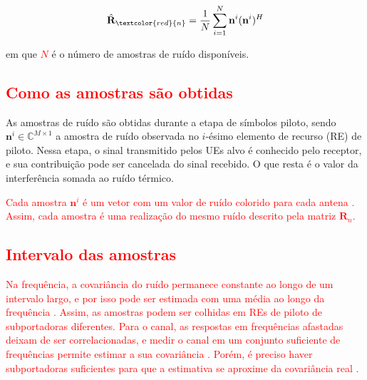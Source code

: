 $$\hat{\mathbf{R}}_{\textcolor{red}{n}}=\frac{1}{N}\sum_{i=1}^{N}\mathbf{n}^i(\mathbf{n}^i)^H$$

em que \textcolor{red}{$N$} é o número de amostras de ruído disponíveis.

\subsection{\texorpdfstring{\textcolor{red}{Como as amostras são obtidas}}{Como as amostras são obtidas}}

As amostras de ruído são obtidas durante a etapa de símbolos piloto, sendo $\mathbf{n}^i \in \mathbb{C}^{M\times1}$ a amostra de ruído observada no $i$-ésimo elemento de recurso (RE) de piloto.  Nessa etapa, o sinal transmitido pelos UEs alvo é conhecido pelo receptor, e sua contribuição pode ser cancelada do sinal recebido. O que resta é o valor da interferência somada ao ruído térmico. 

\textcolor{red}{Cada amostra $\mathbf{n}^i$ é um vetor com um valor de ruído colorido para cada antena \cite{zhao2025jsac}. Assim, cada amostra é uma realização do mesmo ruído descrito pela matriz $\mathbf{R}_n$.}

\subsection{\texorpdfstring{\textcolor{red}{Intervalo das amostras}}{Intervalo das amostras}}

\textcolor{red}{Na frequência, a covariância do ruído permanece constante ao longo de um intervalo largo, e por isso pode ser estimada com uma média ao longo da frequência \cite{zhao2025jsac}. Assim, as amostras podem ser colhidas em REs de piloto de subportadoras diferentes. Para o canal, as respostas em frequências afastadas deixam de ser correlacionadas, e medir o canal em um conjunto suficiente de frequências permite estimar a sua covariância \cite{barriac-madhow}. Porém, é preciso haver subportadoras suficientes para que a estimativa se aproxime da covariância real \cite{barriac-madhow}.}

